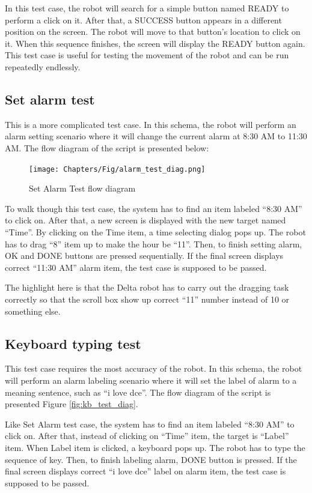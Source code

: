In this test case, the robot will search for a simple button named READY to perform a click on it. After that, a SUCCESS button appears in a different position on the screen. The robot will move to that button's location to click on it. When this sequence finishes, the screen will display the READY button again.
This test case is useful for testing the movement of the robot and can be run repeatedly endlessly.

\subsection{Set alarm test}
This is a more complicated test case. In this schema, the robot will perform an alarm setting scenario where it will change the current alarm at 8:30 AM to 11:30 AM. The flow diagram of the script is presented below:

	\begin{figure}[H]
		\centering
		\texttt{[image: Chapters/Fig/alarm\_test\_diag.png]}
		\caption{Set Alarm Test flow diagram}
		\label{fig:alarm_test_diag}
	\end{figure}

To walk though this test case, the system has to find an item labeled ``8:30 AM'' to click on. After that, a new screen is displayed with the new target named ``Time''. By clicking on the Time item, a time selecting dialog pops up. The robot has to drag ``8'' item up to make the hour be ``11''. Then, to finish setting alarm, OK and DONE buttons are pressed sequentially. If the final screen displays correct ``11:30 AM'' alarm item, the test case is supposed to be passed.

The highlight here is that the Delta robot has to carry out the dragging task correctly so that the scroll box show up correct ``11'' number instead of 10 or something else.

\subsection{Keyboard typing test}
This test case requires the most accuracy of the robot. In this schema, the robot will perform an alarm labeling scenario where it will set the label of alarm to a meaning sentence, such as ``i love dce''. The flow diagram of the script is presented Figure \ref{fig:kb_test_diag}.

Like Set Alarm test case, the system has to find an item labeled ``8:30 AM'' to click on. After that, instead of clicking on ``Time'' item, the target is ``Label'' item. When Label item is clicked, a keyboard pops up. The robot has to type the sequence of key. Then, to finish labeling alarm, DONE button is pressed. If the final screen displays correct ``i love dce'' label on alarm item, the test case is supposed to be passed.

